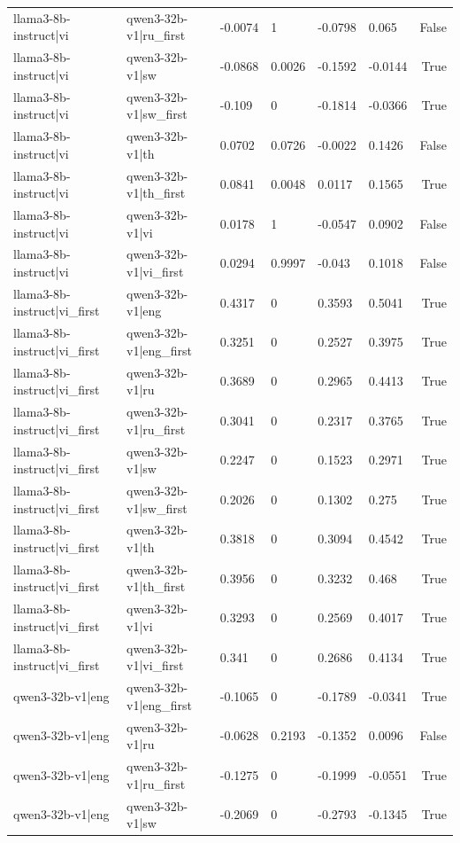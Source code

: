 \begin{table}
\begin{tabular}{llllllr}
llama3-8b-instruct|vi & qwen3-32b-v1|ru_first & -0.0074 & 1 & -0.0798 & 0.065 & False \\
llama3-8b-instruct|vi & qwen3-32b-v1|sw & -0.0868 & 0.0026 & -0.1592 & -0.0144 & True \\
llama3-8b-instruct|vi & qwen3-32b-v1|sw_first & -0.109 & 0 & -0.1814 & -0.0366 & True \\
llama3-8b-instruct|vi & qwen3-32b-v1|th & 0.0702 & 0.0726 & -0.0022 & 0.1426 & False \\
llama3-8b-instruct|vi & qwen3-32b-v1|th_first & 0.0841 & 0.0048 & 0.0117 & 0.1565 & True \\
llama3-8b-instruct|vi & qwen3-32b-v1|vi & 0.0178 & 1 & -0.0547 & 0.0902 & False \\
llama3-8b-instruct|vi & qwen3-32b-v1|vi_first & 0.0294 & 0.9997 & -0.043 & 0.1018 & False \\
llama3-8b-instruct|vi_first & qwen3-32b-v1|eng & 0.4317 & 0 & 0.3593 & 0.5041 & True \\
llama3-8b-instruct|vi_first & qwen3-32b-v1|eng_first & 0.3251 & 0 & 0.2527 & 0.3975 & True \\
llama3-8b-instruct|vi_first & qwen3-32b-v1|ru & 0.3689 & 0 & 0.2965 & 0.4413 & True \\
llama3-8b-instruct|vi_first & qwen3-32b-v1|ru_first & 0.3041 & 0 & 0.2317 & 0.3765 & True \\
llama3-8b-instruct|vi_first & qwen3-32b-v1|sw & 0.2247 & 0 & 0.1523 & 0.2971 & True \\
llama3-8b-instruct|vi_first & qwen3-32b-v1|sw_first & 0.2026 & 0 & 0.1302 & 0.275 & True \\
llama3-8b-instruct|vi_first & qwen3-32b-v1|th & 0.3818 & 0 & 0.3094 & 0.4542 & True \\
llama3-8b-instruct|vi_first & qwen3-32b-v1|th_first & 0.3956 & 0 & 0.3232 & 0.468 & True \\
llama3-8b-instruct|vi_first & qwen3-32b-v1|vi & 0.3293 & 0 & 0.2569 & 0.4017 & True \\
llama3-8b-instruct|vi_first & qwen3-32b-v1|vi_first & 0.341 & 0 & 0.2686 & 0.4134 & True \\
qwen3-32b-v1|eng & qwen3-32b-v1|eng_first & -0.1065 & 0 & -0.1789 & -0.0341 & True \\
qwen3-32b-v1|eng & qwen3-32b-v1|ru & -0.0628 & 0.2193 & -0.1352 & 0.0096 & False \\
qwen3-32b-v1|eng & qwen3-32b-v1|ru_first & -0.1275 & 0 & -0.1999 & -0.0551 & True \\
qwen3-32b-v1|eng & qwen3-32b-v1|sw & -0.2069 & 0 & -0.2793 & -0.1345 & True \\

\end{tabular}
\end{table}
